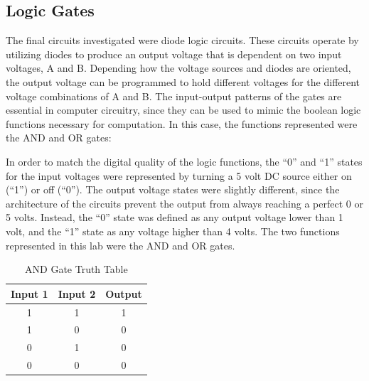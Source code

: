 \documentclass[twocolumn,english]{IEEEtran}
\begin{document}
\subsection{\textbf{Logic Gates}}
The final circuits investigated were diode logic circuits.
These circuits operate by utilizing diodes to produce an output voltage that is dependent on two input voltages, A and B.
Depending how the voltage sources and diodes are oriented, the output voltage can be programmed to hold different voltages for the different voltage combinations of A and B.
The input-output patterns of the gates are essential in computer circuitry, since they can be used to mimic the boolean logic functions necessary for computation.
In this case, the functions represented were the AND and OR gates:


In order to match the digital quality of the logic functions, the ``0'' and ``1'' states for the input voltages were represented by turning a 5 volt DC source either on (``1'') or off (``0'').
The output voltage states were slightly different, since the architecture of the circuits prevent the output from always reaching a perfect 0 or 5 volts.
Instead, the ``0'' state was defined as any output voltage lower than 1 volt, and the ``1'' state as any voltage higher than 4 volts.
The two functions represented in this lab were the AND and OR gates.


\begin{table}[H]
\centering{}
\caption{AND Gate Truth Table}
\begin{tabular}{@{}ccc@{}}
\toprule
\textbf{Input 1} & \multicolumn{1}{l}{\textbf{Input 2}} & \multicolumn{1}{l}{\textbf{Output}} \\ \midrule
1                & 1                                    & 1                                   \\
1                & 0                                    & 0                                   \\
0                & 1                                    & 0                                   \\
0                & 0                                    & 0                                   \\ \bottomrule
\end{tabular}
\end{table}
\end{document}
